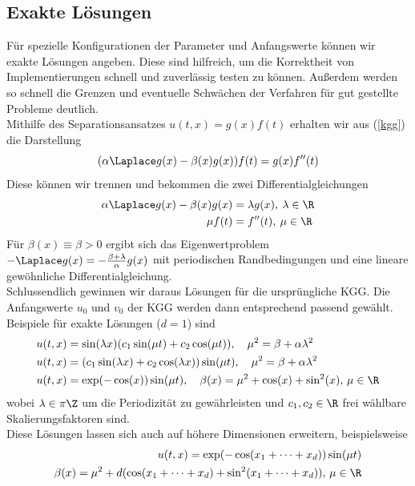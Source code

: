 \subsection{Exakte Lösungen}
Für spezielle Konfigurationen der Parameter und Anfangswerte können wir exakte Lösungen angeben. Diese sind hilfreich, um die Korrektheit von Implementierungen schnell und zuverlässig testen zu können. Außerdem werden so schnell die Grenzen und eventuelle Schwächen der Verfahren für gut gestellte Probleme deutlich.\\[0.5cm]
Mithilfe des Separationsansatzes $u(t,x)=g(x)f(t)$ erhalten wir aus (\ref{kgg}) die Darstellung
\begin{equation*}
(\alpha\Laplace g(x)-\beta(x)g(x))f(t) = g(x)f''(t)
\end{equation*}
Diese können wir trennen und bekommen die zwei Differentialgleichungen
\begin{align*}
\alpha\Laplace g(x)-\beta(x)g(x)&=\lambda g(x), \: \lambda\in\R\\
\mu f(t)&=f''(t), \: \mu\in \R
\end{align*}
Für $\beta(x) \equiv \beta>0$ ergibt sich das Eigenwertproblem $-\Laplace g(x)=-\frac{\beta + \lambda}{\alpha}g(x)$ mit periodischen Randbedingungen und eine lineare gewöhnliche Differentialgleichung.\\
Schlussendlich gewinnen wir daraus Lösungen für die ursprüngliche KGG. Die Anfangswerte $u_0$ und $v_0$ der KGG werden dann entsprechend passend gewählt.\\[1cm]
Beispiele für exakte Lösungen ($d=1$) sind
\begin{align*}
u(t,x)&=\sin(\lambda x)(c_1 \sin(\mu t) + c_2 \cos(\mu t)), \quad \mu^2=\beta+\alpha \lambda^2\\ 
u(t,x)&=(c_1 \sin(\lambda x) + c_2 \cos(\lambda x))\sin(\mu t), \quad \mu^2=\beta+\alpha \lambda^2\\
u(t,x)&=\exp(-\cos(x))\sin(\mu t), \quad \beta(x)=\mu^2+\cos(x)+\sin^2(x), \, \mu \in \R
\end{align*}
wobei $\lambda\in \pi\Z$ um die Periodizität zu gewährleisten und $c_1, c_2 \in \R$ frei wählbare Skalierungsfaktoren sind.\\
Diese Lösungen lassen sich auch auf höhere Dimensionen erweitern, beispielsweise
\begin{eqnarray}
u(t,x)=\exp(-\cos(x_1+\dots+x_d))\sin(\mu t)\\
\beta(x)=\mu^2+d(\cos(x_1+\dots+x_d)+\sin^2(x_1+\dots+x_d)), \, \mu\in\R \nonumber
\end{eqnarray}
